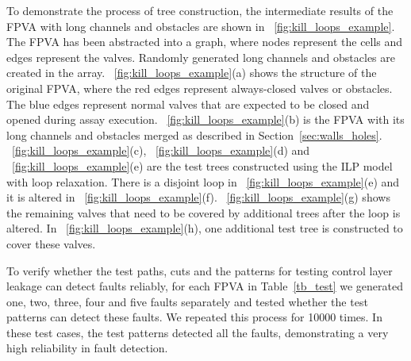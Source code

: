 To demonstrate the process of
 tree construction, the intermediate results of the  FPVA
with long channels and obstacles are shown in \figname~\ref{fig:kill_loops_example}. 
The FPVA has been abstracted into a graph, where nodes represent the
cells and edges represent the valves. Randomly generated long channels and obstacles are
created in the array. 
\figname~\ref{fig:kill_loops_example}(a) shows the structure of the original
FPVA, where the red edges represent always-closed valves or 
obstacles. The blue edges represent normal valves that are expected to be
closed and opened during assay execution.
\figname~\ref{fig:kill_loops_example}(b) is the FPVA with its long channels and
obstacles merged 
as described in Section~\ref{sec:walls_holes}. \figname~\ref{fig:kill_loops_example}(c), \figname~\ref{fig:kill_loops_example}(d) and \figname~\ref{fig:kill_loops_example}(e) are
the test trees constructed using the ILP model 
with loop relaxation. There is a disjoint loop in \figname~\ref{fig:kill_loops_example}(e) and it is altered  
in \figname~\ref{fig:kill_loops_example}(f).
\figname~\ref{fig:kill_loops_example}(g) shows the remaining valves that need
to be covered by additional trees
after the loop is altered. In \figname~\ref{fig:kill_loops_example}(h), one
additional test tree is constructed to cover these valves.

To verify whether the test paths, cuts and the patterns for testing control
layer leakage can detect faults reliably, for each FPVA in
Table~\ref{tb_test} we generated one, two, three, four and five faults
separately and tested whether the test patterns can detect these faults. We
repeated this process for \num[mode=text]{10000} times.  In these test cases,
the test patterns detected all the faults, 
demonstrating a very high reliability in fault detection.

